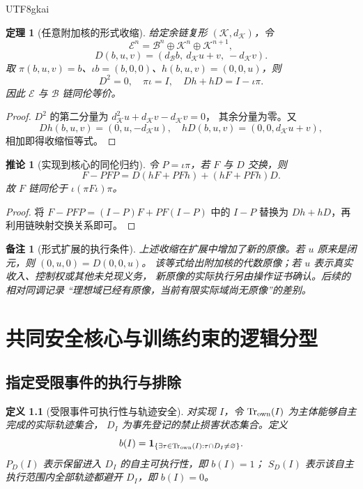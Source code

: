 \documentclass[12pt,a4paper,openany]{report}
\newtheorem{definition}{定义}[chapter]
\newtheorem{theorem}{定理}[chapter]
\newtheorem{corollary}{推论}[chapter]
\newtheorem{remark}{备注}[chapter]
\numberwithin{equation}{chapter}
\begin{document}
\begin{CJK*}{UTF8}{gkai}
\begin{theorem}[任意附加核的形式收缩]
\label{thm:cone}
给定余链复形 $(\mathscr K,d_{\mathscr K})$，令
\[
 \mathscr E^n=\mathscr B^n\oplus\mathscr K^n\oplus\mathscr K^{n+1},
\]
\[
 D(b,u,v)=(d_{\mathscr B}b,\ d_{\mathscr K}u+v,\ -d_{\mathscr K}v).
\]
取 $\pi(b,u,v)=b$、$\iota b=(b,0,0)$、$h(b,u,v)=(0,0,u)$，则
\[
 D^2=0,\quad \pi\iota=I,\quad
 Dh+hD=I-\iota\pi.
\]
因此 $\mathscr E$ 与 $\mathscr B$ 链同伦等价。
\end{theorem}
\begin{proof}
$D^2$ 的第二分量为 $d_{\mathscr K}^2u+d_{\mathscr K}v-d_{\mathscr K}v=0$，
其余分量为零。又
\[
 Dh(b,u,v)=(0,u,-d_{\mathscr K}u),\quad
 hD(b,u,v)=(0,0,d_{\mathscr K}u+v),
\]
相加即得收缩恒等式。
\end{proof}

\begin{corollary}[实现到核心的同伦归约]
令 $P=\iota\pi$，若 $F$ 与 $D$ 交换，则
\[
 F-PFP=D(hF+PFh)+(hF+PFh)D.
\]
故 $F$ 链同伦于 $\iota(\pi F\iota)\pi$。
\end{corollary}
\begin{proof}
将 $F-PFP=(I-P)F+PF(I-P)$ 中的 $I-P$ 替换为 $Dh+hD$，再利用链映射交换关系即可。
\end{proof}

\begin{remark}[形式扩展的执行条件]
上述收缩在扩展中增加了新的原像。若 $u$ 原来是闭元，则 $(0,u,0)=D(0,0,u)$。
该等式给出附加核的代数原像；若 $u$ 表示真实收入、控制权或其他未兑现义务，
新原像的实际执行另由操作证书确认。后续的相对同调记录
“理想域已经有原像，当前有限实际域尚无原像”的差别。
\end{remark}

\chapter{共同安全核心与训练约束的逻辑分型}
\label{chap:safety}

\section{指定受限事件的执行与排除}

\begin{definition}[受限事件可执行性与轨迹安全]
对实现 $I$，令 $\operatorname{Tr}_{\rm own}(I)$ 为主体能够自主完成的实际轨迹集合，
$D_I$ 为事先登记的禁止损害状态集合。定义
\[
 b(I)=\mathbf1_{\{\exists\tau\in\operatorname{Tr}_{\rm own}(I):
                         \tau\cap D_I\ne\varnothing\}}.
\]
$P_D(I)$ 表示保留进入 $D_I$ 的自主可执行性，即 $b(I)=1$；
$S_D(I)$ 表示该自主执行范围内全部轨迹都避开 $D_I$，即 $b(I)=0$。
\end{definition}


\end{CJK*}
\end{document}
